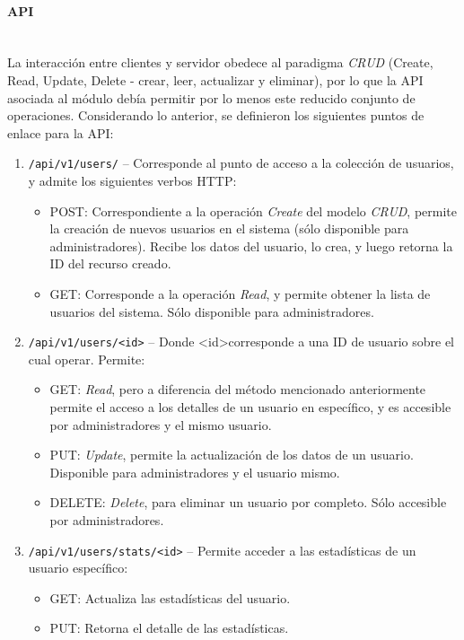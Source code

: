 \documentclass[11pt,letterpaper]{article}
\begin{document}
\paragraph{API\\\\}

La interacción entre clientes y servidor obedece al paradigma \emph{CRUD} (Create, Read, Update, Delete - crear, leer, actualizar y eliminar), por lo que la API asociada al módulo debía permitir por lo menos este reducido conjunto de operaciones. Considerando lo anterior, se definieron los siguientes puntos de enlace para la API:

\begin{enumerate}
    \item \texttt{/api/v1/users/} -- Corresponde al punto de acceso a la colección de usuarios, y admite los siguientes verbos HTTP:
    \begin{itemize}
        \item POST: Correspondiente a la operación \emph{Create} del modelo \emph{CRUD}, permite la creación de nuevos usuarios en el sistema (sólo disponible para administradores). Recibe los datos del usuario, lo crea, y luego retorna la ID del recurso creado.
        \item GET: Corresponde a la operación \emph{Read}, y permite obtener la lista de usuarios del sistema. Sólo disponible para administradores.
    \end{itemize}
    \item \texttt{/api/v1/users/\textless id\textgreater} -- Donde \textless id\textgreater corresponde a una ID de usuario sobre el cual operar. Permite:
    \begin{itemize}
        \item GET: \emph{Read}, pero a diferencia del método mencionado anteriormente permite el acceso a los detalles de un usuario en específico, y es accesible por administradores y el mismo usuario.
        \item PUT: \emph{Update}, permite la actualización de los datos de un usuario. Disponible para administradores y el usuario mismo.
        \item DELETE: \emph{Delete}, para eliminar un usuario por completo. Sólo accesible por administradores.
    \end{itemize}
    \item \texttt{/api/v1/users/stats/\textless id\textgreater} -- Permite acceder a las estadísticas de un usuario específico:
    \begin{itemize}
        \item GET: Actualiza las estadísticas del usuario.
        \item PUT: Retorna el detalle de las estadísticas.
    \end{itemize}
\end{enumerate}
\end{document}
